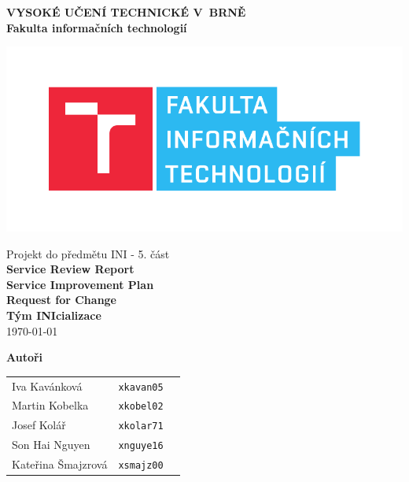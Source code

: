 \begin{titlepage}

    \centering

    {\fontsize{20pt}{15pt}\bfseries
    VYSOKÉ UČENÍ TECHNICKÉ V~BRNĚ\\
    \vspace{8pt}
    Fakulta informačních technologií
    }


    \includegraphics[scale=0.7]{./assets/fit-logo.pdf}

    \vspace{22pt}

    {\Large Projekt do předmětu INI - 5. část\\}
    \vspace{16pt}
    {\LARGE \bfseries Service Review Report\\Service Improvement Plan\\Request for Change\\}
    \vspace{90pt}
    {\Large \bfseries Tým INIcializace\\}
    \vspace{50pt}
    {\Large \today}

    \vspace{90pt}
    {\Large \bfseries Autoři\\}
    \vspace{12pt}
    

    \begin{tabular}{ l c r }
        Iva Kavánková & \texttt{xkavan05} \\
        Martin Kobelka & \texttt{xkobel02} \\
        Josef Kolář & \texttt{xkolar71} \\
        Son Hai Nguyen & \texttt{xnguye16} \\
        Kateřina Šmajzrová & \texttt{xsmajz00} \\
    \end{tabular}\\

\end{titlepage}